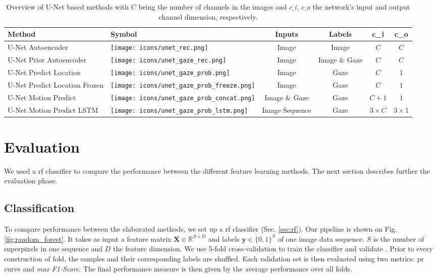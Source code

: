 \begin{table}[!htbp]
   \centering
   \caption[U-Net based method overview]{Overview of U-Net based methods with $C$ being the number of channels in the images and $c\_i$, $c\_o$ the network's input and output channel dimension, respectively.}
   \begin{tabular}{l|m{1.3cm}|c|c|c|c}
      \toprule
      \textbf{Method} & \textbf{Symbol} & \textbf{Inputs} & \textbf{Labels} & \textbf{c\_i} & \textbf{c\_o} \\
      \midrule
      U-Net Autoencoder & \texttt{[image: icons/unet\_rec.png]} & Image & Image & $C$ & $C$ \\
      \midrule
      U-Net Prior Autoencoder & \texttt{[image: icons/unet\_gaze\_rec.png]} & Image & Image \& Gaze & $C$ & $C$ \\
      \midrule
      U-Net Predict Location & \texttt{[image: icons/unet\_gaze\_prob.png]} & Image & Gaze & $C$ & $1$ \\
      \midrule
      U-Net Predict Location Frozen & \texttt{[image: icons/unet\_gaze\_prob\_freeze.png]} & Image & Gaze & $C$ & $1$ \\
      \midrule
      U-Net Motion Predict & \texttt{[image: icons/unet\_gaze\_prob\_concat.png]} & Image \& Gaze & Gaze & $C+1$ & $1$ \\
       \midrule
      U-Net Motion Predict LSTM & \texttt{[image: icons/unet\_gaze\_prob\_lstm.png]} & Image Sequence & Gaze & $3 \times C$ & $3 \times 1$ \\
      \bottomrule
   \end{tabular}
   \label{tab:summary_unet_methods}
\end{table}


\section{Evaluation}
We used a \gls{rf} classifier to compare the performance between the different feature learning methods.
The next section describes further the evaluation phase.


\subsection{Classification} \label{random_forest}
To compare performance between the elaborated methods, we set up a \gls{rf} classifier (Sec. \ref{sec:rf}).
Our pipeline is shown on Fig. \ref{fig:random_forest}.
It takes as input a feature matrix $\bm{X} \in \mathbb{R}^{S \times D}$ and labels $\bm{y} \in \{0,1\}^{S}$ of one image data sequence.
$S$ is the number of superpixels in one sequence and $D$ the feature dimension.
We use 5-fold cross-validation to train the classifier and validate \cite[p. 241]{hastie09}.
Prior to every construction of fold, the samples and their corresponding labels are shuffled.
Each validation set is then evaluated using two metrics: \gls{pr} curve and \textit{max F1-Score}.
The final performance measure is then given by the average performance over all folds.

